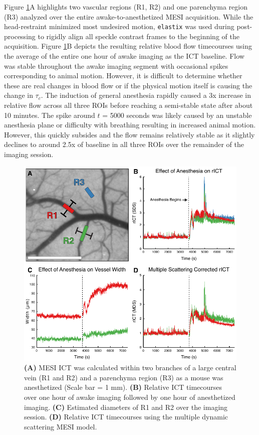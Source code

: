 Figure \ref{fig:flowawakeanes}A highlights two vascular regions (R1, R2) and one parenchyma region (R3) analyzed over the entire awake-to-anesthetized MESI acquisition. While the head-restraint minimized most undesired motion, \texttt{elastix} was used during post-processing to rigidly align all speckle contrast frames to the beginning of the acquisition. Figure \ref{fig:flowawakeanes}B depicts the resulting relative blood flow timecourses using the average of the entire one hour of awake imaging as the ICT baseline. Flow was stable throughout the awake imaging segment with occasional spikes corresponding to animal motion. However, it is difficult to determine whether these are real changes in blood flow or if the physical motion itself is causing the change in $\tau_c$. The induction of general anesthesia rapidly caused a 3x increase in relative flow across all three ROIs before reaching a semi-stable state after about 10 minutes. The spike around $t$ = 5000 seconds was likely caused by an unstable anesthesia plane or difficulty with breathing resulting in increased animal motion. However, this quickly subsides and the flow remains relatively stable as it slightly declines to around 2.5x of baseline in all three ROIs over the remainder of the imaging session.

\begin{figure}
    \includegraphics{figures/chapter_5/flowawakeanes.pdf}
    \caption{
        \label{fig:flowawakeanes}
        \textbf{(A)} MESI ICT was calculated within two branches of a large central vein (R1 and R2) and a parenchyma region (R3) as a mouse was anesthetized (Scale bar = 1 mm). \textbf{(B)} Relative ICT timecourses over one hour of awake imaging followed by one hour of anesthetized imaging. \textbf{(C)} Estimated diameters of R1 and R2 over the imaging session. \textbf{(D)} Relative ICT timecourses using the multiple dynamic scattering MESI model.
    }
\end{figure}

